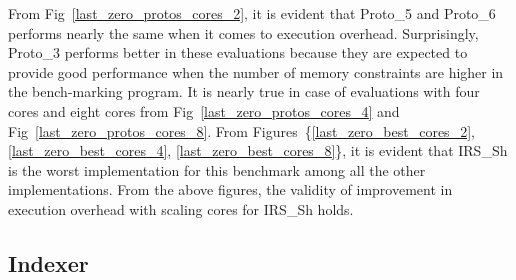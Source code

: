 From Fig~\ref{last_zero_protos_cores_2}, it is evident that Proto\_5 and Proto\_6 performs nearly the same when it comes to execution overhead. 
Surprisingly, Proto\_3 performs better in these evaluations because they are expected to provide good performance when the number of memory constraints are higher in the bench-marking program. 
It is nearly true in case of evaluations with four cores and eight cores from Fig~\ref{last_zero_protos_cores_4} and Fig~\ref{last_zero_protos_cores_8}. 
From Figures~\{\ref{last_zero_best_cores_2}, \ref{last_zero_best_cores_4}, \ref{last_zero_best_cores_8}\}, it is evident that IRS\_Sh is the worst implementation for this benchmark among all the other implementations. 
From the above figures, the validity of improvement in execution overhead with scaling cores for IRS\_Sh holds. 




\subsection{Indexer}



